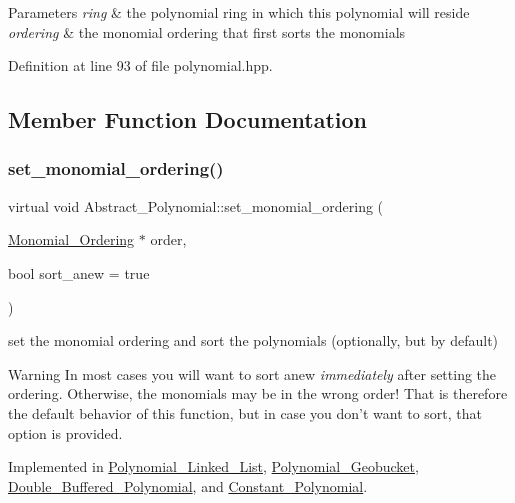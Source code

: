 \begin{DoxyParams}{Parameters}
{\em ring} & the polynomial ring in which this polynomial will reside \\
\hline
{\em ordering} & the monomial ordering that first sorts the monomials \\
\hline
\end{DoxyParams}


Definition at line 93 of file polynomial.\+hpp.



\subsection{Member Function Documentation}
\mbox{\label{class_abstract___polynomial_ad783804725a64f09fff6eeec058afe98}} 
\subsubsection{\texorpdfstring{set\+\_\+monomial\+\_\+ordering()}{set\_monomial\_ordering()}}
{\footnotesize\ttfamily virtual void Abstract\+\_\+\+Polynomial\+::set\+\_\+monomial\+\_\+ordering (\begin{DoxyParamCaption}\item[{\hyperlink{class_monomial___ordering}{Monomial\+\_\+\+Ordering} $\ast$}]{order,  }\item[{bool}]{sort\+\_\+anew = {\ttfamily true} }\end{DoxyParamCaption})\hspace{0.3cm}{\ttfamily [pure virtual]}}



set the monomial ordering and sort the polynomials (optionally, but by default) 

\begin{DoxyWarning}{Warning}
In most cases you will want to sort anew {\itshape immediately} after setting the ordering. Otherwise, the monomials may be in the wrong order! That is therefore the default behavior of this function, but in case you don't want to sort, that option is provided. 
\end{DoxyWarning}


Implemented in \hyperlink{class_polynomial___linked___list_a150055edb9ec7b59ec3217fb7f411e6e}{Polynomial\+\_\+\+Linked\+\_\+\+List}, \hyperlink{class_polynomial___geobucket_a77030f8f042b33358d74012f039f69e4}{Polynomial\+\_\+\+Geobucket}, \hyperlink{class_double___buffered___polynomial_ae0cb00f5657fcc0c51c5c6e9659b89a3}{Double\+\_\+\+Buffered\+\_\+\+Polynomial}, and \hyperlink{class_constant___polynomial_a25ba5d0effd0ad2a0e577906bdc9b99b}{Constant\+\_\+\+Polynomial}.

